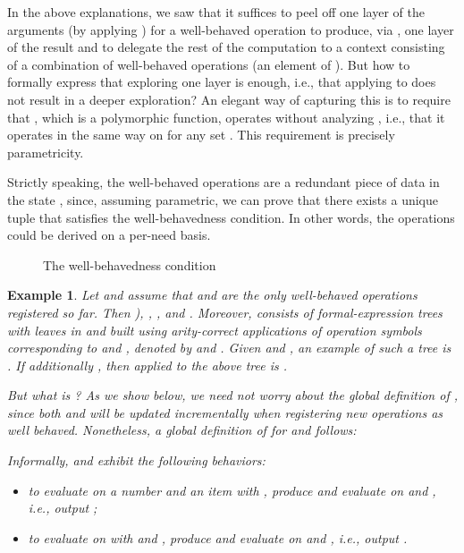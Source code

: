 \documentclass[preprint,draft]
{sigplanconf}
\newtheorem{eexample}[theorem]{Example}
\newcommand{\<}{\langle}
\renewcommand{\>}{\rangle}
\begin{document}
In the above explanations, we saw that it suffices to peel off one layer of
the arguments  (by applying )
for a well-behaved operation
 to produce, via , one layer of the result and to delegate the rest of the computation to a context consisting of a combination of well-behaved
operations (an element of ). But how to formally express that exploring one layer is enough, i.e., that applying 
to 
does not result in a deeper exploration? An elegant way of capturing this is to require that , which is a polymorphic function,
operates without analyzing , i.e., that it
operates in the same way on  for any set . This
requirement is precisely parametricity.

Strictly speaking, the well-behaved operations  are a redundant piece of data in the state ,
since, assuming  parametric, we can prove that there exists a unique tuple  that satisfies the well-behavedness condition.
In other words, the operations  could be derived on a per-need basis.





\begin{figure}

\vspace*{-1ex} \caption{The well-behavedness condition}
\label{fig-reg}
\end{figure}


\begin{eexample}\rm \label{exa-state}
Let  and assume that  and
 are the only well-behaved operations registered so far.
Then ), ,
, and .
Moreover, 
consists of formal-expression trees with leaves in  and built using
arity-correct applications of operation symbols corresponding to
 and , denoted by  and .  Given  and ,
an example of such a tree is .
If additionally , then  applied to the above tree is .

But what is ? As we show below, we need not worry about the global definition of , since both  and  will be updated
{incrementally} when registering new operations as well behaved.
Nonetheless, a global definition of  for  and  follows:

Informally,  and  exhibit the following behaviors:
\begin{itemize}
\item to evaluate  on a number  and an item  with ,
produce  and evaluate  on  and , i.e.,
output ;
\item to evaluate  on  with  and ,
produce  and evaluate  on  and , i.e., output
.
\end{itemize}
\end{eexample}
\end{document}
